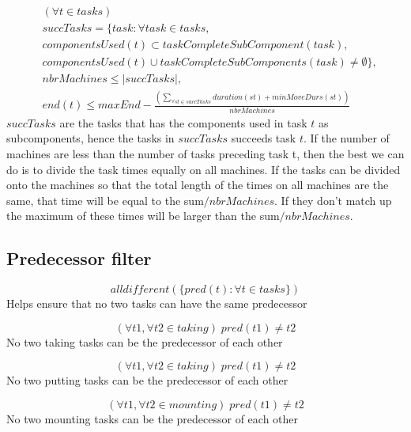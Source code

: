  \begin{equation}\label{eq:73}
 \begin{aligned}
 &(\forall t \in tasks)\\
 &succTasks = \{task : \forall task \in tasks, \\
 &componentsUsed(t) \subset taskCompleteSubComponent(task), \\
 &componentsUsed(t) \cup taskCompleteSubComponents(task) \neq \emptyset\}, \\
 &nbrMachines \le |succTasks|, \\
 &end(t) \le maxEnd - \frac{\left(\sum_{\forall st \in succTasks}duration(st) + minMoveDurs(st)\right)}{nbrMachines}
 \end{aligned}
 \end{equation}
 $succTasks$ are the tasks that has the components used in task $t$ as subcomponents, hence the tasks in $succTasks$ succeeds task $t$. If the number of machines are less than the number of tasks preceding task t, then the best we can do is to divide the task times equally on all machines. If the tasks can be divided onto the machines so that the total length of the times on all machines are the same, that time will be equal to the sum$/nbrMachines$. If they don't match up the maximum of these times will be larger than the sum$/nbrMachines$.
 
 
 \subsection{Predecessor filter}
 \begin{equation}\label{eq:74}
 alldifferent(\{pred(t) : \forall t \in tasks\})
 \end{equation}
 Helps ensure that no two tasks can have the same predecessor
 
 \begin{equation}\label{eq:75}
 (\forall t1, \forall t2 \in taking) \; pred(t1) \neq t2
 \end{equation}
 No two taking tasks can be the predecessor of each other
 
 \begin{equation}\label{eq:76}
 (\forall t1, \forall t2 \in taking) \; pred(t1) \neq t2
 \end{equation}
 No two putting tasks can be the predecessor of each other
 
 \begin{equation}\label{eq:77}
 ( \forall t1, \forall t2 \in mounting) \; pred(t1) \neq t2
 \end{equation}
 No two mounting tasks can be the predecessor of each other
 

